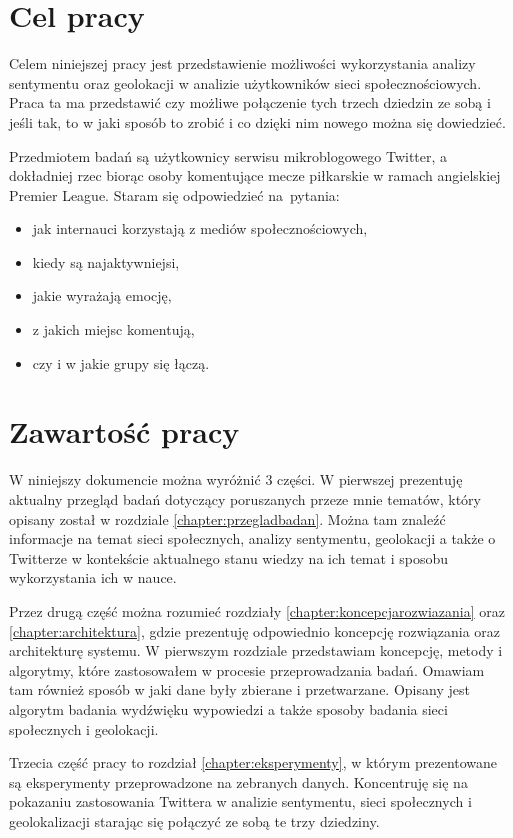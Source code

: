 \section{Cel pracy}
Celem niniejszej pracy jest przedstawienie możliwości wykorzystania
analizy sentymentu oraz geolokacji w analizie użytkowników sieci
społecznościowych. Praca ta ma przedstawić czy możliwe połączenie tych trzech
dziedzin ze sobą i jeśli tak, to w jaki sposób to zrobić i co dzięki
nim nowego można się dowiedzieć.

Przedmiotem badań są użytkownicy serwisu mikroblogowego Twitter, a dokładniej
rzec biorąc osoby komentujące mecze piłkarskie w ramach angielskiej Premier
League.
Staram się odpowiedzieć na~pytania:
\begin{itemize}
  \item jak internauci korzystają z mediów społecznościowych,
  \item kiedy są najaktywniejsi,
  \item jakie wyrażają emocję,
  \item z jakich miejsc komentują,
  \item czy i w jakie grupy się łączą.
\end{itemize}

\section{Zawartość pracy}
W niniejszy dokumencie można wyróżnić 3 części. W pierwszej prezentuję
aktualny przegląd badań dotyczący poruszanych przeze mnie tematów, który
opisany został w rozdziale \ref{chapter:przegladbadan}. Można tam znaleźć
informacje na temat sieci społecznych, analizy sentymentu, geolokacji
a także o Twitterze w kontekście aktualnego stanu wiedzy na ich temat i sposobu
wykorzystania ich w nauce.

Przez drugą część można rozumieć rozdziały \ref{chapter:koncepcjarozwiazania}
oraz \ref{chapter:architektura}, gdzie prezentuję odpowiednio koncepcję
rozwiązania oraz architekturę systemu. W pierwszym rozdziale
przedstawiam koncepcję, metody i algorytmy, które zastosowałem w procesie
przeprowadzania badań. Omawiam tam również sposób w jaki dane były zbierane
i przetwarzane. Opisany jest algorytm badania wydźwięku wypowiedzi a także
sposoby badania sieci społecznych i geolokacji.

Trzecia część pracy to rozdział \ref{chapter:eksperymenty}, w którym
prezentowane są eksperymenty przeprowadzone na zebranych danych.
Koncentruję się na pokazaniu zastosowania Twittera w analizie
sentymentu, sieci społecznych i geolokalizacji starając się połączyć
ze sobą te trzy dziedziny.

